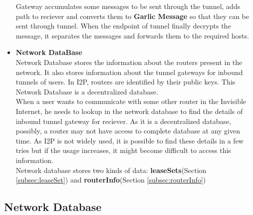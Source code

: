 \documentclass{main}
\begin{document}
\begin{itemize}
		Gateway accumulates some messages to be sent through the tunnel, adds path to reciever and
		converts them to \textbf{Garlic Message} so that they can be sent through tunnel.
		When the endpoint of tunnel finally decrypts the message, it separates the messages and forwards them 
		to the required hosts.
	\item \textbf{Network DataBase} \\
		Network Database stores the information about the routers present in the network. It also stores information
		about the tunnel gateways for inbound tunnels of users. In I2P, routers are identified by their public keys.
		This Network Database is a decentralized database. \\
		When a user wants to communicate with some other router in the Invisible Internet, he needs to lookup in the
		network database to find the details of inbound tunnel gateway for reciever. As it is a decentralized database,
		possibly, a router may not have access to complete database at any given time. As I2P is not widely used, it 
		is possible to find these details in a few tries but if the usage increases, it might become difficult to access
		this information.\\
		Network database stores two kinds of data: \textbf{leaseSets}(Section \ref{subsec:leaseSet}) and \textbf{routerInfo}(Section \ref{subsec:routerInfo})

\end{itemize}
\subsection{Network Database}
\end{document}
